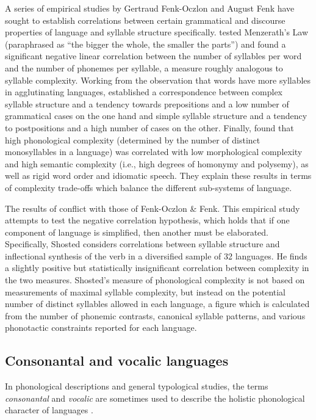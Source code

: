   A series of empirical studies by Gertraud Fenk-Oczlon and August Fenk have sought to establish correlations between certain grammatical and discourse properties of language and syllable structure specifically. \citet{FenkFenkOczlon1993} tested Menzerath’s Law (paraphrased as “the bigger the whole, the smaller the parts”) and found a significant negative linear correlation between the number of syllables per word and the number of phonemes per syllable, a measure roughly analogous to syllable complexity. Working from the observation that words have more syllables in agglutinating languages, \citet{FenkOczlonFenk2005} established a correspondence between complex syllable structure and a tendency towards prepositions and a low number of grammatical cases on the one hand and simple syllable structure and a tendency to postpositions and a high number of cases on the other. Finally, \citet{FenkOczlonFenk2008} found that high phonological complexity (determined by the number of distinct monosyllables in a language) was correlated with low morphological complexity and high semantic complexity (i.e., high degrees of homonymy and polysemy), as well as rigid word order and idiomatic speech. They explain these results in terms of complexity trade-offs which balance the different sub-systems of language.

  The results of \citet{Shosted2006} conflict with those of Fenk-Oczlon \& Fenk. This empirical study attempts to test the negative correlation hypothesis, which holds that if one component of language is simplified, then another must be elaborated. Specifically, Shosted considers correlations between syllable structure and inflectional synthesis of the verb in a diversified sample of 32 languages. He finds a slightly positive but statistically insignificant correlation between complexity in the two measures. Shosted’s measure of phonological complexity is not based on measurements of maximal syllable complexity, but instead on the potential number of distinct syllables allowed in each language, a figure which is calculated from the number of phonemic contrasts, canonical syllable patterns, and various phonotactic constraints reported for each language.

\subsection{Consonantal and vocalic languages}\label{sec:1.3.3}

  In phonological descriptions and general typological studies, the terms \textit{consonantal} and \textit{vocalic} are sometimes used to describe the holistic phonological character of languages .

